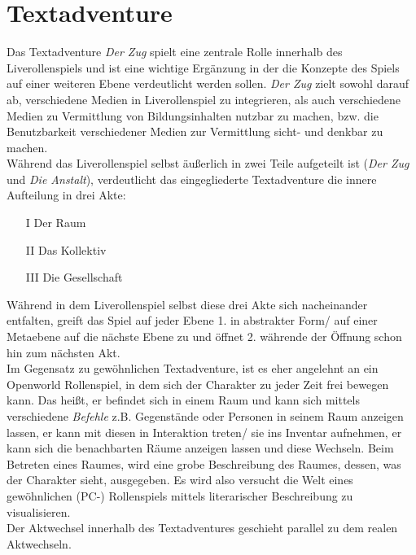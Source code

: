 \documentclass[a4paper, 12pt]{scrartcl}
\begin{document}
    \section{Textadventure}
    Das Textadventure \textit{Der Zug} spielt eine zentrale Rolle innerhalb des Liverollenspiels und ist eine wichtige Ergänzung in der die Konzepte des Spiels auf einer weiteren Ebene verdeutlicht werden sollen. 
    \textit{Der Zug} zielt sowohl darauf ab, verschiedene Medien in Liverollenspiel zu integrieren, als auch verschiedene Medien zu Vermittlung von Bildungsinhalten nutzbar zu machen, bzw. die Benutzbarkeit verschiedener Medien zur Vermittlung sicht- und denkbar zu machen.\\
    Während das Liverollenspiel selbst äußerlich in zwei Teile aufgeteilt ist (\textit{Der Zug} und \textit{Die Anstalt}), verdeutlicht das eingegliederte Textadventure die innere Aufteilung in drei Akte: 
    \begin{itemize}
    \item[I] Der Raum
    \item[II] Das Kollektiv 
    \item[III] Die Gesellschaft
    \end{itemize}
    Während in dem Liverollenspiel selbst diese drei Akte sich nacheinander entfalten, greift das Spiel auf jeder Ebene 1. in abstrakter Form/ auf einer Metaebene auf die nächste Ebene zu und öffnet 2. währende der Öffnung schon hin zum nächsten Akt. \\
    Im Gegensatz zu \glqq gewöhnlichen\grqq{} Textadventure, ist es eher angelehnt an ein Openworld Rollenspiel, in dem sich der Charakter zu jeder Zeit frei bewegen kann.
    Das heißt, er befindet sich in einem Raum und kann sich mittels verschiedene \textit{Befehle} z.B. Gegenstände oder Personen in seinem Raum anzeigen lassen, er kann mit diesen in Interaktion treten/ sie ins Inventar aufnehmen, er kann sich die benachbarten Räume anzeigen lassen und diese Wechseln. 
    Beim Betreten eines Raumes, wird eine grobe Beschreibung des Raumes, dessen, was der Charakter sieht, ausgegeben. 
    Es wird also versucht die Welt eines gewöhnlichen (PC-) Rollenspiels mittels literarischer Beschreibung zu visualisieren. \\
    Der Aktwechsel innerhalb des Textadventures geschieht parallel zu dem realen Aktwechseln. 
\end{document}
